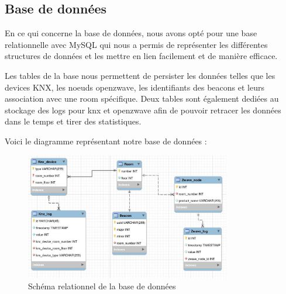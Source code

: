 \subsection{Base de données}
En ce qui concerne la base de données, nous avons opté pour une base relationnelle avec MySQL qui nous a permis de représenter les différentes structures de données et les mettre en lien facilement et de manière efficace.

Les tables de la base nous permettent de persister les données telles que les devices KNX, les noeuds openzwave, les identifiants des beacons et leurs association avec une room spécifique. Deux tables sont également dediées au stockage des logs pour knx et openzwave afin de pouvoir retracer les données dans le temps et tirer des statistiques.

Voici le diagramme représentant notre base de données :


\begin{figure}
    \begin{center}
        \includegraphics[width=0.8\textwidth]{img/diagramme_db.jpg}
    \end{center}
    \caption{Schéma relationnel de la base de données}
    \label{db_schema}
\end{figure}
